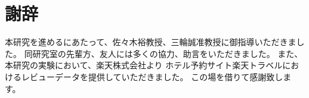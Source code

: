 \section*{謝辞}

本研究を進めるにあたって、佐々木裕教授、三輪誠准教授に御指導いただきました。
同研究室の先輩方、友人には多くの協力、助言をいただきました。
また、本研究の実験において、楽天株式会社より
ホテル予約サイト楽天トラベルにおけるレビューデータを提供していただきました。
この場を借りて感謝致します。
